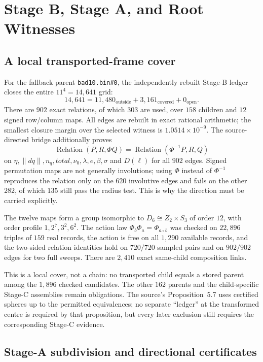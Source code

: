 \documentclass[10pt]{article}
\theoremstyle{definition}
\newcommand{\norm}[1]{\lVert #1\rVert}
\begin{document}
\section{Stage B, Stage A, and Root Witnesses}
\label{sec:stageb}

\subsection{A local transported-frame cover}

For the fallback parent \texttt{bad10.bin\#0}, the independently rebuilt Stage-B ledger closes the entire $11^4=14{,}641$ grid:
\[
14{,}641=11{,}480_{\text{outside}}+3{,}161_{\text{covered}}+0_{\text{open}}.
\]
There are $902$ exact relations, of which $303$ are used, over $158$ children and $12$ signed row/column maps. All edges are rebuilt in exact rational arithmetic; the smallest closure margin over the selected witness is $1.0514\times10^{-9}$. The source-directed bridge additionally proves
\[
\operatorname{Relation}(P,R,\Phi Q)=\operatorname{Relation}(\Phi^{-1}P,R,Q)
\]
on $\eta,\norm{dq},n_q,total,\nu_0,\lambda,e,\beta,\sigma$ and $D(\ell)$ for all $902$ edges. Signed permutation maps are not generally involutions; using $\Phi$ instead of $\Phi^{-1}$ reproduces the relation only on the $620$ involutive edges and fails on the other $282$, of which $135$ still pass the radius test. This is why the direction must be carried explicitly.

The twelve maps form a group isomorphic to $D_6\cong Z_2\times S_3$ of order $12$, with order profile $1,2^7,3^2,6^2$. The action law $\Phi_b\Phi_a=\Phi_{a\circ b}$ was checked on $22{,}896$ triples of $159$ real records, the action is free on all $1{,}290$ available records, and the two-sided relation identities hold on $720/720$ sampled pairs and on $902/902$ edges for two full sweeps. There are $2{,}410$ exact same-child composition links.

This is a local cover, not a chain: no transported child equals a stored parent among the $1{,}896$ checked candidates. The other $162$ parents and the child-specific Stage-C assemblies remain obligations. The source's Proposition~5.7 uses certified spheres up to the permitted equivalences; no separate ``ledger'' at the transformed centre is required by that proposition, but every later exclusion still requires the corresponding Stage-C evidence.

\subsection{Stage-A subdivision and directional certificates}
\label{sec:stagea-root}
\end{document}
